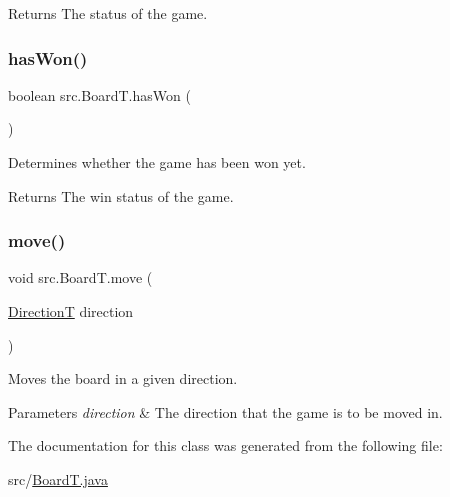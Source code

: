 \begin{DoxyReturn}{Returns}
The status of the game. 
\end{DoxyReturn}
\mbox{\label{classsrc_1_1BoardT_aee8e1e801e17ee024328467079a7f26f}} 
\subsubsection{\texorpdfstring{has\+Won()}{hasWon()}}
{\footnotesize\ttfamily boolean src.\+Board\+T.\+has\+Won (\begin{DoxyParamCaption}{ }\end{DoxyParamCaption})}



Determines whether the game has been won yet. 

\begin{DoxyReturn}{Returns}
The win status of the game. 
\end{DoxyReturn}
\mbox{\label{classsrc_1_1BoardT_a2b00baabe65a2ea417f9f5f7da212d5e}} 
\subsubsection{\texorpdfstring{move()}{move()}}
{\footnotesize\ttfamily void src.\+Board\+T.\+move (\begin{DoxyParamCaption}\item[{\hyperlink{enumsrc_1_1DirectionT}{DirectionT}}]{direction }\end{DoxyParamCaption})}



Moves the board in a given direction. 


\begin{DoxyParams}{Parameters}
{\em direction} & The direction that the game is to be moved in. \\
\hline
\end{DoxyParams}


The documentation for this class was generated from the following file\+:\begin{DoxyCompactItemize}
\item 
src/\hyperlink{BoardT_8java}{Board\+T.\+java}\end{DoxyCompactItemize}
